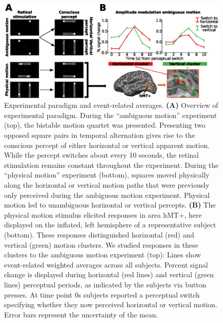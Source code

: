 \begin{figure}[htb!]
\centering
\includegraphics[width=\textwidth]{figures/chapter_03/fig1.eps}
\caption{Experimental paradigm and event-related averages. \textbf{(A)} Overview of experimental paradigm. During the “ambiguous motion” experiment (top), the bistable motion quartet was presented. Presenting two opposed square pairs in temporal alternation gives rise to the conscious percept of either horizontal or vertical apparent motion. While the percept switches about every 10 seconds, the retinal stimulation remains constant throughout the experiment. During the “physical motion” experiment (bottom), squares moved physically along the horizontal or vertical motion paths that were previously only perceived during the ambiguous motion experiment. Physical motion led to unambiguous horizontal or vertical percepts. \textbf{(B)} The physical motion stimulus elicited responses in area hMT+, here displayed on the inflated, left hemisphere of a representative subject (bottom). These responses distinguished horizontal (red) and vertical (green) motion clusters. We studied responses in these clusters to the ambiguous motion experiment (top): Lines show event-related weighted averages across all subjects. Percent signal change is displayed during horizontal (red lines) and vertical (green lines) perceptual periods, as indicated by the subjects via button presses. At time point 0s subjects reported a perceptual switch specifying whether they now perceived horizontal or vertical motion. Error bars represent the uncertainty of the mean.}
\label{fig:paradigm}
\end{figure}


